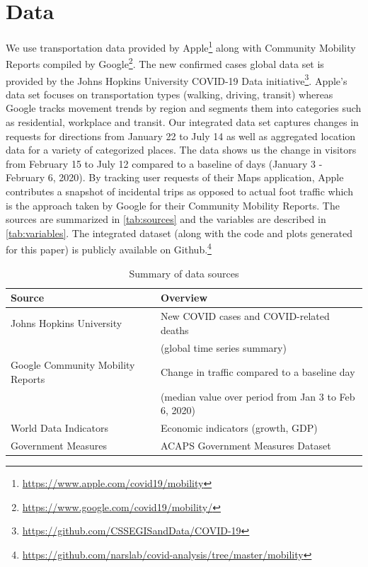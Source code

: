 \documentclass[preprint, 12pt]{elsarticle}
\newcommand{\?}{\stackrel{?}{=}}
\begin{document}
\section{Data}
We use transportation data provided by Apple\footnote{\url{https://www.apple.com/covid19/mobility}} along with Community Mobility Reports compiled by Google\footnote{\url{https://www.google.com/covid19/mobility/}}. %
The new confirmed cases global data set is provided by the Johns Hopkins University COVID-19 Data initiative\footnote{\url{https://github.com/CSSEGISandData/COVID-19}}.
Apple's data set focuses on transportation types (walking, driving, transit) whereas Google tracks movement trends by region and segments them into categories such as residential, workplace and transit. Our integrated data set captures changes in requests for directions from January 22 to July 14 as well as aggregated location data for a variety of categorized places. The data shows us the change in visitors from February 15 to July 12 compared to a baseline of days (January 3 - February 6, 2020). By tracking user requests of their Maps application, Apple contributes a snapshot of incidental trips as opposed to actual foot traffic which is the approach taken by Google for their Community Mobility Reports. 
The sources are summarized in \autoref{tab:sources} and the variables are described in \autoref{tab:variables}.
The integrated dataset (along with the code and plots generated for this paper) is publicly available on Github.\footnote{\url{https://github.com/narslab/covid-analysis/tree/master/mobility}}


\begin{table}[h!]\small
  \centering
  \caption{Summary of data sources}
  \label{tab:sources}
\begin{tabular}{ll}\toprule
\bf Source                         		         & \bf Overview                                                                              \\\midrule
Johns Hopkins University          	         & New COVID cases and COVID-related deaths \\
  & (global time series summary)                                                              \\
Google Community Mobility Reports      & Change in traffic compared to a baseline day \\
  & (median value over period from Jan 3 to Feb 6, 2020) 			\\
World Data Indicators 		         & Economic indicators (growth, GDP) \\
Government Measures		         & ACAPS Government Measures Dataset \\\bottomrule
\end{tabular}
\end{table}
\end{document}
